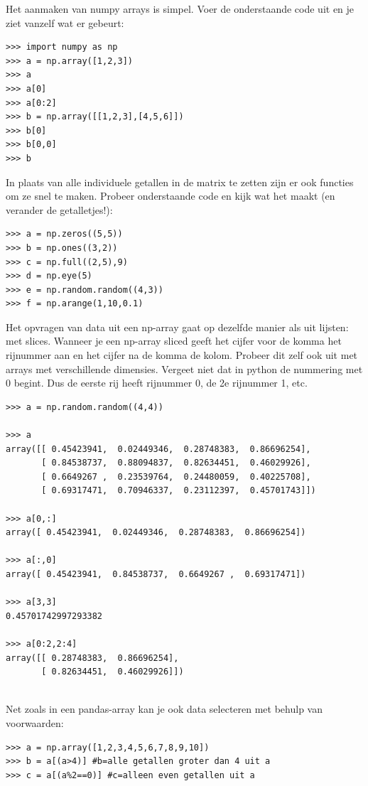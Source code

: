 Het aanmaken van numpy arrays is simpel. Voer de onderstaande code uit en je ziet vanzelf wat er gebeurt:
\begin{lstlisting}[frame=single]
>>> import numpy as np
>>> a = np.array([1,2,3])
>>> a
>>> a[0]
>>> a[0:2]
>>> b = np.array([[1,2,3],[4,5,6]])
>>> b[0]
>>> b[0,0]
>>> b
\end{lstlisting}

In plaats van alle individuele getallen in de matrix te zetten zijn er ook functies om ze snel te maken. Probeer onderstaande code en kijk wat het maakt (en verander de getalletjes!):
\begin{lstlisting}[frame=single]
>>> a = np.zeros((5,5))
>>> b = np.ones((3,2))
>>> c = np.full((2,5),9)
>>> d = np.eye(5)
>>> e = np.random.random((4,3))
>>> f = np.arange(1,10,0.1)
\end{lstlisting}

Het opvragen van data uit een np-array gaat op dezelfde manier als uit lijsten: met slices.
Wanneer je een np-array sliced geeft het cijfer voor de komma het rijnummer aan en het cijfer na de komma de kolom. 
Probeer dit zelf ook uit met arrays met verschillende dimensies. Vergeet niet dat in python de nummering met 0 begint. Dus de eerste rij heeft rijnummer 0, de 2e rijnummer 1, etc.

\begin{lstlisting}[frame=single]
>>> a = np.random.random((4,4))

>>> a
array([[ 0.45423941,  0.02449346,  0.28748383,  0.86696254],
       [ 0.84538737,  0.88094837,  0.82634451,  0.46029926],
       [ 0.6649267 ,  0.23539764,  0.24480059,  0.40225708],
       [ 0.69317471,  0.70946337,  0.23112397,  0.45701743]])

>>> a[0,:]
array([ 0.45423941,  0.02449346,  0.28748383,  0.86696254])

>>> a[:,0]
array([ 0.45423941,  0.84538737,  0.6649267 ,  0.69317471])

>>> a[3,3]
0.45701742997293382

>>> a[0:2,2:4]
array([[ 0.28748383,  0.86696254],
       [ 0.82634451,  0.46029926]])
       
\end{lstlisting}

Net zoals in een pandas-array kan je ook data selecteren met behulp van voorwaarden:
\begin{lstlisting}[frame=single]
>>> a = np.array([1,2,3,4,5,6,7,8,9,10])
>>> b = a[(a>4)] #b=alle getallen groter dan 4 uit a
>>> c = a[(a%2==0)] #c=alleen even getallen uit a
\end{lstlisting}

